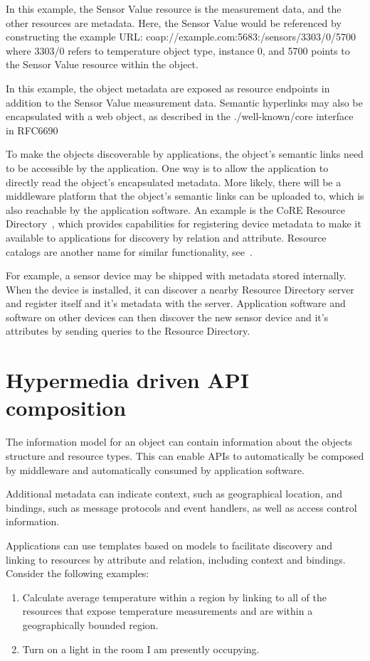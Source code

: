 \documentclass[journal]{IEEEtran}
\begin{document}
In this example, the Sensor Value resource is the measurement data, and the other resources are metadata. Here, the Sensor Value would be referenced by constructing the example URL: coap://example.com:5683:/sensors/3303/0/5700 where 3303/0 refers to temperature object type, instance 0, and 5700 points to the Sensor Value resource within the object.

In this example, the object metadata are exposed as resource endpoints in addition to the Sensor Value measurement data. Semantic hyperlinks may also be encapsulated with a web object, as described in the ./well-known/core interface in RFC6690~\cite{RFC6690}

To make the objects discoverable by applications, the object's semantic links need to be accessible by the application. One way is to allow the application to directly read the object's encapsulated metadata. More likely, there will be a middleware platform that the object's semantic links can be uploaded to, which is also reachable by the application software. An example is the CoRE Resource Directory~\cite{draft-ietf-core-resource-directory}, which provides capabilities for registering device metadata to make it available to applications for discovery by relation and attribute. Resource catalogs are another name for similar functionality, see~\cite{HyperCat}.

For example, a sensor device may be shipped with metadata stored internally. When the device is installed, it can discover a nearby Resource Directory server and register itself and it's metadata with the server. Application software and software on other devices can then discover the new sensor device and it's attributes by sending queries to the Resource Directory.

\section{Hypermedia driven API composition}
The information model for an object can contain information about the objects structure and resource types. This can enable APIs to automatically be composed by middleware and automatically consumed by application software. 

Additional metadata can indicate context, such as geographical location, and bindings, such as message protocols and event handlers, as well as access control information.

Applications can use templates based on models to facilitate discovery and linking to resources by attribute and relation, including context and bindings. Consider the following examples: 
\begin{enumerate}
  \item Calculate average temperature within a region by linking to all of the resources that expose temperature measurements and are within a geographically bounded region.
  \item Turn on a light in the room I am presently occupying.
\end{enumerate} 
\end{document}
